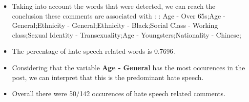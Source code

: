 \documentclass[11pt]{article}
\begin{document}
\begin{itemize}\item Taking into account the words that were detected, we can reach the conclusion these comments are associated with : : Age - Over 65s;Age - General;Ethnicity - General;Ethnicity - Black;Social Class - Working class;Sexual Identity - Transexuality;Age - Youngsters;Nationality - Chinese;%

\item The percentage of hate speech related words is 0.7696.

\item Considering that the variable \textbf{Age - General} has the most occurences in the post, we can interpret that this is the predominant hate speech.

\item Overall there were 50/142 occurences of hate speech related comments.\end{itemize}
\end{document}
